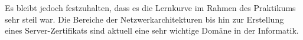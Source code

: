 \documentclass[
a4paper,     %
 headsepline, %
footsepline, %
titlepage,   %
 halfparskip,     %
 fleqn,       %
12pt         %
]{scrartcl}  %
\begin{document}
Es bleibt jedoch festzuhalten, dass es die Lernkurve im Rahmen des Praktikums sehr steil war. Die Bereiche der Netzwerkarchitekturen bis hin zur Erstellung eines Server-Zertifikats sind aktuell eine sehr wichtige Domäne in der Informatik. 


 \appendix %

 

 
\end{document}
